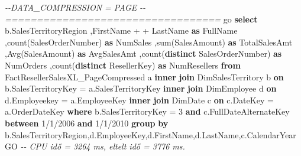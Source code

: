 \documentclass[
  magyar,
]{article}
\newenvironment{Shaded}{}{}
\newcommand{\CommentTok}[1]{\textcolor[rgb]{0.38,0.63,0.69}{\textit{#1}}}
\newcommand{\DecValTok}[1]{\textcolor[rgb]{0.25,0.63,0.44}{#1}}
\newcommand{\FunctionTok}[1]{\textcolor[rgb]{0.02,0.16,0.49}{#1}}
\newcommand{\KeywordTok}[1]{\textcolor[rgb]{0.00,0.44,0.13}{\textbf{#1}}}
\newcommand{\NormalTok}[1]{#1}
\newcommand{\OperatorTok}[1]{\textcolor[rgb]{0.40,0.40,0.40}{#1}}
\newcommand{\StringTok}[1]{\textcolor[rgb]{0.25,0.44,0.63}{#1}}
\begin{document}
\begin{Shaded}
\begin{Highlighting}[]
\CommentTok{{-}{-}DATA\_COMPRESSION = PAGE}
\CommentTok{{-}{-}==================================}
\NormalTok{go}
\KeywordTok{select}\NormalTok{ b.SalesTerritoryRegion}
\NormalTok{  ,FirstName }\OperatorTok{+} \StringTok{\textquotesingle{} \textquotesingle{}} \OperatorTok{+}\NormalTok{ LastName }\KeywordTok{as}\NormalTok{ FullName}
\NormalTok{  ,}\FunctionTok{count}\NormalTok{(SalesOrderNumber) }\KeywordTok{as}\NormalTok{ NumSales}
\NormalTok{  ,}\FunctionTok{sum}\NormalTok{(SalesAmount) }\KeywordTok{as}\NormalTok{ TotalSalesAmt}
\NormalTok{  ,}\FunctionTok{Avg}\NormalTok{(SalesAmount) }\KeywordTok{as}\NormalTok{ AvgSalesAmt}
\NormalTok{  ,}\FunctionTok{count}\NormalTok{(}\KeywordTok{distinct}\NormalTok{ SalesOrderNumber) }\KeywordTok{as}\NormalTok{ NumOrders}
\NormalTok{  ,}\FunctionTok{count}\NormalTok{(}\KeywordTok{distinct}\NormalTok{ ResellerKey) }\KeywordTok{as}\NormalTok{ NumResellers}
\KeywordTok{from}\NormalTok{ FactResellerSalesXL\_PageCompressed a}
\KeywordTok{inner} \KeywordTok{join}\NormalTok{ DimSalesTerritory b }\KeywordTok{on}\NormalTok{ b.SalesTerritoryKey }\OperatorTok{=}\NormalTok{ a.SalesTerritoryKey}
\KeywordTok{inner} \KeywordTok{join}\NormalTok{ DimEmployee d }\KeywordTok{on}\NormalTok{ d.Employeekey }\OperatorTok{=}\NormalTok{ a.EmployeeKey}
\KeywordTok{inner} \KeywordTok{join}\NormalTok{ DimDate c }\KeywordTok{on}\NormalTok{ c.DateKey }\OperatorTok{=}\NormalTok{ a.OrderDateKey}
\KeywordTok{where}\NormalTok{ b.SalesTerritoryKey }\OperatorTok{=} \DecValTok{3}
  \KeywordTok{and}\NormalTok{ c.FullDateAlternateKey }\KeywordTok{between} \StringTok{\textquotesingle{}1/1/2006\textquotesingle{}} \KeywordTok{and} \StringTok{\textquotesingle{}1/1/2010\textquotesingle{}}
\KeywordTok{group} \KeywordTok{by}\NormalTok{ b.SalesTerritoryRegion,d.EmployeeKey,d.FirstName,d.LastName,c.CalendarYear}
\NormalTok{GO  }\CommentTok{{-}{-} CPU idő = 3264 ms, eltelt idő = 3776 ms.}


\end{Highlighting}
\end{Shaded}
\end{document}
